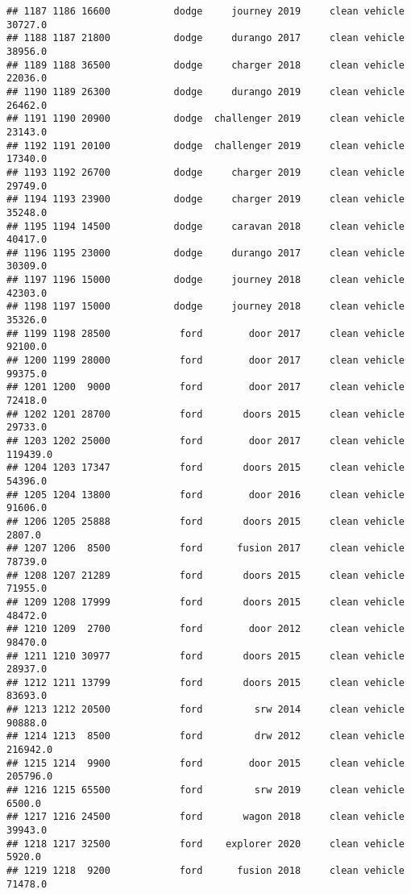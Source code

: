 \documentclass[
]{article}
\begin{document}
\begin{verbatim}
## 1187 1186 16600           dodge     journey 2019     clean vehicle   30727.0
## 1188 1187 21800           dodge     durango 2017     clean vehicle   38956.0
## 1189 1188 36500           dodge     charger 2018     clean vehicle   22036.0
## 1190 1189 26300           dodge     durango 2019     clean vehicle   26462.0
## 1191 1190 20900           dodge  challenger 2019     clean vehicle   23143.0
## 1192 1191 20100           dodge  challenger 2019     clean vehicle   17340.0
## 1193 1192 26700           dodge     charger 2019     clean vehicle   29749.0
## 1194 1193 23900           dodge     charger 2019     clean vehicle   35248.0
## 1195 1194 14500           dodge     caravan 2018     clean vehicle   40417.0
## 1196 1195 23000           dodge     durango 2017     clean vehicle   30309.0
## 1197 1196 15000           dodge     journey 2018     clean vehicle   42303.0
## 1198 1197 15000           dodge     journey 2018     clean vehicle   35326.0
## 1199 1198 28500            ford        door 2017     clean vehicle   92100.0
## 1200 1199 28000            ford        door 2017     clean vehicle   99375.0
## 1201 1200  9000            ford        door 2017     clean vehicle   72418.0
## 1202 1201 28700            ford       doors 2015     clean vehicle   29733.0
## 1203 1202 25000            ford        door 2017     clean vehicle  119439.0
## 1204 1203 17347            ford       doors 2015     clean vehicle   54396.0
## 1205 1204 13800            ford        door 2016     clean vehicle   91606.0
## 1206 1205 25888            ford       doors 2015     clean vehicle    2807.0
## 1207 1206  8500            ford      fusion 2017     clean vehicle   78739.0
## 1208 1207 21289            ford       doors 2015     clean vehicle   71955.0
## 1209 1208 17999            ford       doors 2015     clean vehicle   48472.0
## 1210 1209  2700            ford        door 2012     clean vehicle   98470.0
## 1211 1210 30977            ford       doors 2015     clean vehicle   28937.0
## 1212 1211 13799            ford       doors 2015     clean vehicle   83693.0
## 1213 1212 20500            ford         srw 2014     clean vehicle   90888.0
## 1214 1213  8500            ford         drw 2012     clean vehicle  216942.0
## 1215 1214  9900            ford        door 2015     clean vehicle  205796.0
## 1216 1215 65500            ford         srw 2019     clean vehicle    6500.0
## 1217 1216 24500            ford       wagon 2018     clean vehicle   39943.0
## 1218 1217 32500            ford    explorer 2020     clean vehicle    5920.0
## 1219 1218  9200            ford      fusion 2018     clean vehicle   71478.0

\end{verbatim}
\end{document}
